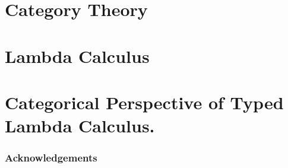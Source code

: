 \documentclass[
11pt,
english, %
singlespacing, %
headsepline, %
]{MastersDoctoralThesis} %
\author{Pedro Bonilla Nadal}
\theoremstyle{definition}
\begin{document}
\frontmatter


\cleardoublepage

% 
% 
\pagestyle{thesis}
{
  \hypersetup{hidelinks}
  \setcounter{tocdepth}{2}
  \tableofcontents
}
%                
%                       

\mainmatter
\part{Category Theory}
\thispagestyle{empty}
\label{Part1}





\part{Lambda Calculus}
\label{Part2}




\part{Categorical Perspective of Typed Lambda Calculus.}




\appendix


\section*{Acknowledgements}



\medskip
{}
\printbibliography
\end{document}

